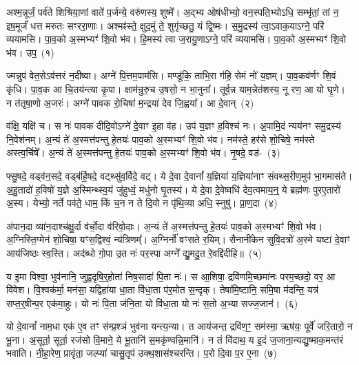 \setcounter{anuvakam}{0}
अश्म॒न्नूर्जं॒ पर्व॑ते शिश्रिया॒णां वाते॑ प॒र्जन्ये॒ वरु॑णस्य॒ शुष्मे᳚। अ॒द्भ्य ओष॑धीभ्यो॒ वन॒स्पति॒भ्यो\-ऽधि॒ सम्भृ॑तां॒ तां न॒ इष॒मूर्जं॑ धत्त मरुतः सꣳररा॒णाः। अश्मꣴ॑स्ते॒ क्षुद॒मुं ते॒ शुगृ॑च्छतु॒ यं द्वि॒ष्मः। स॒मु॒द्रस्य॑ त्वा॒\-ऽवाक॒या\-ऽ\-ग्ने॒ परि॑ व्ययामसि। पा॒व॒को अ॒स्मभ्यꣳ॑ शि॒वो भ॑व। हि॒मस्य॑ त्वा ज॒रायु॒णा\-ऽ\-ग्ने॒ परि॑ व्ययामसि। पा॒व॒को अ॒स्मभ्यꣳ॑ शि॒वो भ॑व। उप॒~(१)\ip

ज्मन्नुप॑ वेत॒से\-ऽव॑त्तरं न॒दीष्वा। अग्ने॑ पि॒त्तम॒पाम॑सि। मण्डू॑कि॒ ताभि॒रा ग॑हि॒ सेमं नो॑ य॒ज्ञम्। पा॒व॒कव॑र्णꣳ शि॒वं कृ॑धि। पा॒व॒क आ चि॒तय॑न्त्या कृ॒पा। क्षाम॑न्रुरु॒च उ॒षसो॒ न भा॒नुना᳚। तूर्व॒न्न याम॒न्नेत॑शस्य॒ नू रण॒ आ यो घृ॒णे। न त॑तृषा॒णो अ॒जरः॑। अग्ने॑ पावक रो॒चिषा॑ म॒न्द्रया॑ देव जि॒ह्वया᳚। आ दे॒वान्~(२)\ip

व॑क्षि॒ यक्षि॑ च। स नः॑ पावक दीदि॒वो\-ऽग्ने॑ दे॒वाꣳ इ॒हा व॑ह। उप॑ य॒ज्ञꣳ ह॒विश्च॑ नः। अ॒पामि॒दं न्यय॑नꣳ समु॒द्रस्य॑ नि॒वेश॑नम्। अ॒न्यं ते॑ अ॒स्मत्त॑पन्तु हे॒तयः॑ पाव॒को अ॒स्मभ्यꣳ॑ शि॒वो भ॑व। नम॑स्ते॒ हर॑से शो॒चिषे॒ नम॑स्ते अस्त्व॒र्चिषे᳚। अ॒न्यं ते॑ अ॒स्मत्त॑पन्तु हे॒तयः॑ पाव॒को अ॒स्मभ्यꣳ॑ शि॒वो भ॑व। नृ॒षदे॒ वड॑-~(३)\ip

फ्सु॒षदे॒ वड्व॑न॒सदे॒ वड्ब॑र्\mbox{}हि॒षदे॒ वट्थ्सु॑व॒र्विदे॒ वट्। ये दे॒वा दे॒वानां᳚ य॒ज्ञिया॑ य॒ज्ञिया॑नाꣳ संवथ्स॒रीण॒मुप॑ भा॒गमास॑ते। अ॒हु॒तादो॑ ह॒विषो॑ य॒ज्ञे अ॒स्मिन्थ्स्व॒यं जु॑हुध्वं॒ मधु॑नो घृ॒तस्य॑। ये दे॒वा दे॒वेष्वधि॑ देव॒त्वमाय॒न्॒ ये ब्रह्म॑णः पुरए॒तारो॑ अ॒स्य। येभ्यो॒ नर्ते पव॑ते॒ धाम॒ किं च॒न न ते दि॒वो न पृ॑थि॒व्या अधि॒ स्नुषु॑। प्रा॒ण॒दा~(४)\ip

अ॑पान॒दा व्या॑न॒दाश्च॑क्षु॒र्दा व॑र्चो॒दा व॑रिवो॒दाः। अ॒न्यं ते॑ अ॒स्मत्त॑पन्तु हे॒तयः॑ पाव॒को अ॒स्मभ्यꣳ॑ शि॒वो भ॑व। अ॒ग्निस्ति॒ग्मेन॑ शो॒चिषा॒ यꣳस॒द्विश्वं॒ न्य॑त्रिणम्᳚। अ॒ग्निर्नो॑ वꣳसते र॒यिम्। सैनानी॑केन सुवि॒दत्रो॑ अ॒स्मे यष्टा॑ दे॒वाꣳ आय॑जिष्ठः स्व॒स्ति। अद॑ब्धो गो॒पा उ॒त नः॑ पर॒स्पा अग्ने᳚ द्यु॒मदु॒त रे॒वद्दि॑दीहि॥~(५)\ip

{\anuvakamend[{उप॑ दे॒वान् वट्प्रा॑ण॒दाश्चतु॑श्चत्वारिꣳशच्च}]}

य इ॒मा विश्वा॒ भुव॑नानि॒ जुह्व॒दृषि॒र्॒\mbox{}होता॑ निष॒सादा॑ पि॒ता नः॑। स आ॒शिषा॒ द्रवि॑णमि॒च्छमा॑नः परम॒च्छदो॒ वर॒ आ वि॑वेश। वि॒श्वक॑र्मा॒ मन॑सा॒ यद्विहा॑या धा॒ता वि॑धा॒ता प॑र॒मोत स॒न्दृक्। तेषा॑मि॒ष्टानि॒ समि॒षा म॑दन्ति॒ यत्र॑ सप्त॒र्॒\mbox{}षीन्प॒र एक॑मा॒हुः। यो नः॑ पि॒ता ज॑नि॒ता यो वि॑धा॒ता यो नः॑ स॒तो अ॒भ्या सज्ज॒जान॑।~(६)\ip

यो दे॒वानां᳚ नाम॒धा एक॑ ए॒व तꣳ स॑म्प्र॒श्ञं भुव॑ना यन्त्य॒न्या। त आय॑जन्त॒ द्रवि॑ण॒ꣳ॒ सम॑स्मा॒ ऋष॑यः॒ पूर्वे॑ जरि॒तारो॒ न भू॒ना। अ॒सूर्ता॒ सूर्ता॒ रज॑सो वि॒माने॒ ये भू॒तानि॑ स॒मकृ॑ण्वन्नि॒मानि॑। न तं वि॑दाथ॒ य इ॒दं ज॒जाना॒न्यद्यु॒ष्माक॒मन्त॑रं भवाति। नी॒हा॒रेण॒ प्रावृ॑ता॒ जल्प्या॑ चासु॒तृप॑ उक्थ॒शास॑श्चरन्ति। प॒रो दि॒वा प॒र ए॒ना~(७)\ip

